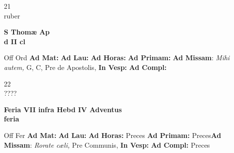 \documentclass[10pt, openany]{book}
\begin{document}
    \begin{center}
        \begin{minipage}{3.5in}
            \vspace{2em}
            \begin{minipage}{0.5in}
                {\Huge 21} \\
                {\normalsize ruber}
            \end{minipage}
            \begin{minipage}{3.0in}
                \textbf{ \large S Thomæ Ap \\
                \textnormal{\normalsize d II cl}}

            \end{minipage}
            \begin{justify}Off Ord
                \textbf{Ad Mat: }
                \textbf{Ad Lau: }
                \textbf{Ad Horas: }
                \textbf{Ad Primam: }\textbf{Ad Missam}: \textit{Mihi autem,} G, C, Pre de Apostolis, 
                \textbf{In Vesp: }
                \textbf{Ad Compl: }
            \end{justify}
        \end{minipage}
    \end{center}

    \begin{center}
        \begin{minipage}{3.5in}
            \vspace{2em}
            \begin{minipage}{0.5in}
                {\Huge 22} \\
                {\normalsize ????}
            \end{minipage}
            \begin{minipage}{3.0in}
                \textbf{ \large Feria VII infra Hebd IV Adventus \\
                \textnormal{\normalsize feria}}

            \end{minipage}
            \begin{justify}Off Fer
                \textbf{Ad Mat: }
                \textbf{Ad Lau: }
                \textbf{Ad Horas: }Preces
                \textbf{Ad Primam: }Preces\textbf{Ad Missam}: \textit{Rorate cæli,} Pre Communis, 
                \textbf{In Vesp: }
                \textbf{Ad Compl: }Preces
            \end{justify}
        \end{minipage}
    \end{center}
\end{document}
